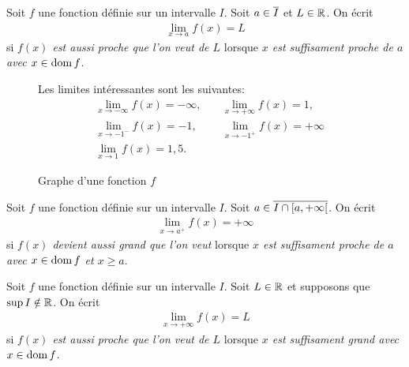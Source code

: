 \documentclass[main.tex]{subfiles}
\begin{document}
\begin{definition}

    Soit $f$ une fonction définie sur un intervalle $I$.
    Soit $a \in \overline{I}$ et $L \in \mathbb{R}$.
    On écrit
    \begin{align}
        \lim_{x \to a} f(x) = L
    \end{align}
    si \emph{$f(x)$ est aussi proche que l'on veut de $L$}
    lorsque \emph{$x$ est suffisament proche de $a$ avec $x \in \operatorname{dom} f$}.
\end{definition}

\begin{figure}
    \centering
    \begin{plot}{0.25}{-10}{-10}{10}{10}
    \end{plot}
    \caption{Graphe d'une fonction $f$}
    Les limites intéressantes sont les suivantes:
    \begin{align}
        &\lim_{x \to -\infty} f(x) = -\infty, \quad
        &\lim_{x \to +\infty} f(x) = 1,\\
        &\lim_{x \to -1^-} f(x) = -1, \quad
        &\lim_{x \to -1^+} f(x) = +\infty\\
        &\lim_{x \to 1} f(x) = 1,5.
    \end{align}
\end{figure}

\begin{definition}

    Soit $f$ une fonction définie sur un intervalle $I$.
    Soit $a \in \overline{I \cap [a, +\infty[}$.
    On écrit
    \begin{align}
        \lim_{x \to a^+} f(x) = +\infty
    \end{align}
    si \emph{$f(x)$ devient aussi grand que l'on veut}
    lorsque \emph{$x$ est suffisament proche de $a$ avec $x \in \operatorname{dom} f$ et $x \geq a$}.
\end{definition}

\begin{definition}

    Soit $f$ une fonction définie sur un intervalle $I$.
    Soit $L \in \mathbb{R}$ et supposons que $\sup I \notin \mathbb{R}$.
    On écrit
    \begin{align}
        \lim_{x \to +\infty} f(x) = L
    \end{align}
    si \emph{$f(x)$ est aussi proche que l'on veut de $L$}
    lorsque \emph{$x$ est suffisament grand avec $x \in \operatorname{dom} f$}.
\end{definition}
\end{document}
